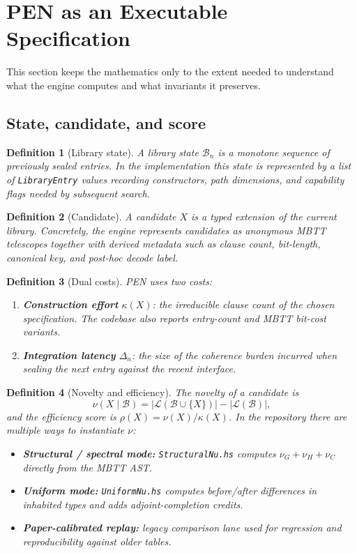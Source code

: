 \documentclass[11pt,a4paper]{article}
\newtheorem{definition}{Definition}[section]
\begin{document}
\section{PEN as an Executable Specification}
\label{sec:model}

This section keeps the mathematics only to the extent needed to understand what the engine computes and what invariants it preserves.

\subsection{State, candidate, and score}

\begin{definition}[Library state]
A library state $\mathcal{B}_n$ is a monotone sequence of previously sealed entries. In the implementation this state is represented by a list of \texttt{LibraryEntry} values recording constructors, path dimensions, and capability flags needed by subsequent search.
\end{definition}

\begin{definition}[Candidate]
A candidate $X$ is a typed extension of the current library. Concretely, the engine represents candidates as anonymous MBTT telescopes together with derived metadata such as clause count, bit-length, canonical key, and post-hoc decode label.
\end{definition}

\begin{definition}[Dual costs]
PEN uses two costs:
\begin{enumerate}[nosep]
  \item \textbf{Construction effort} $\kappa(X)$: the irreducible clause count of the chosen specification. The codebase also reports entry-count and MBTT bit-cost variants.
  \item \textbf{Integration latency} $\Delta_n$: the size of the coherence burden incurred when sealing the next entry against the recent interface.
\end{enumerate}
\end{definition}

\begin{definition}[Novelty and efficiency]
The novelty of a candidate is
\[
\nu(X\mid \mathcal{B}) = |\mathcal{L}(\mathcal{B}\cup\{X\})| - |\mathcal{L}(\mathcal{B})|,
\]
and the efficiency score is $\rho(X)=\nu(X)/\kappa(X)$. In the repository there are multiple ways to instantiate $\nu$:
\begin{itemize}[nosep]
  \item \textbf{Structural / spectral mode:} \texttt{StructuralNu.hs} computes $\nu_G+\nu_H+\nu_C$ directly from the MBTT AST.
  \item \textbf{Uniform mode:} \texttt{UniformNu.hs} computes before/after differences in inhabited types and adds adjoint-completion credits.
  \item \textbf{Paper-calibrated replay:} legacy comparison lane used for regression and reproducibility against older tables.
\end{itemize}
\end{definition}
\end{document}
